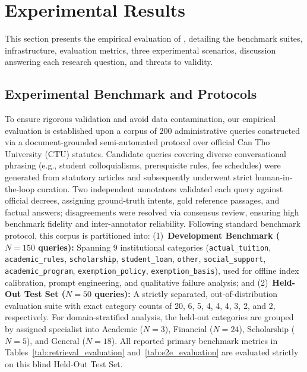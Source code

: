 \section{Experimental Results}
\label{sec:exp}

This section presents the empirical evaluation of \system{}, detailing the benchmark suites, infrastructure, evaluation metrics, three experimental scenarios, discussion answering each research question, and threats to validity.

\subsection{Experimental Benchmark and Protocols}
\label{sec:dataset}

To ensure rigorous validation and avoid data contamination, our empirical evaluation is established upon a corpus of $200$ administrative queries constructed via a document-grounded semi-automated protocol over official Can Tho University (CTU) statutes. Candidate queries covering diverse conversational phrasing (e.g., student colloquialisms, prerequisite rules, fee schedules) were generated from statutory articles and subsequently underwent strict human-in-the-loop curation. Two independent annotators validated each query against official decrees, assigning ground-truth intents, gold reference passages, and factual answers; disagreements were resolved via consensus review, ensuring high benchmark fidelity and inter-annotator reliability. Following standard benchmark protocol, this corpus is partitioned into: (1)~\textbf{Development Benchmark ($N=150$ queries):} Spanning 9 institutional categories (\texttt{actual\_tuition}, \texttt{academic\_rules}, \texttt{scholarship}, \texttt{student\_loan}, \texttt{other}, \texttt{social\_support}, \texttt{academic\_program}, \texttt{exemption\_policy}, \texttt{exemption\_basis}), used for offline index calibration, prompt engineering, and qualitative failure analysis; and (2)~\textbf{Held-Out Test Set ($N=50$ queries):} A strictly separated, out-of-distribution evaluation suite with exact category counts of 20, 6, 5, 4, 4, 4, 3, 2, and 2, respectively. For domain-stratified analysis, the held-out categories are grouped by assigned specialist into Academic ($N=3$), Financial ($N=24$), Scholarship ($N=5$), and General ($N=18$). All reported primary benchmark metrics in Tables~\ref{tab:retrieval_evaluation} and~\ref{tab:e2e_evaluation} are evaluated strictly on this blind Held-Out Test Set.

